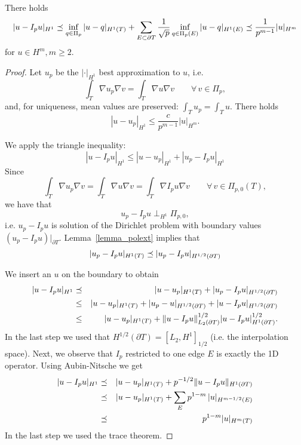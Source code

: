 \begin{theorem}  There holds 
$$
| u - I_p u |_{H^1} \preceq
\inf_{q \in \Pi_p} | u - q |_{H^1(T)} + 
\sum_{E \subset \partial T} \frac{1}{\sqrt{p}} \inf_{q \in \Pi_p(E)} | u - q |_{H^1(E)}
\preceq 
\frac{1}{p^{m-1}} | u |_{H^m} 
$$
for $u \in H^m, m \geq 2$.  
\end{theorem}
\begin{proof} Let $u_p$ be the $|\cdot |_{H^1}$ best approximation to $u$, i.e.
$$
\int_T \nabla u_p \nabla v = \int_T \nabla u \nabla v \qquad \forall \, v \in \Pi_p,
$$
and, for uniqueness, mean values are preserved: $\int_T u_p = \int_T u$. There holds
$$
| u - u_p |_{H^1} \leq  \frac{c}{p^{m-1}} | u |_{H^m}.
$$

We apply the triangle inequality:
$$
| u - I_p u |_{H^1} \leq | u - u_p |_{H^1} + | u_p - I_p u |_{H^1}
$$
Since 
$$
\int_T \nabla u_p \nabla v = \int_T \nabla u \nabla v = \int_T \nabla I_p u  \nabla v
\qquad \forall \, v \in \Pi_{p,0}(T),
$$
we have that
$$
u_p - I_p u \; \bot_{H^1} \; \Pi_{p,0},
$$
i.e. $u_p - I_p u$ is solution of the Dirichlet problem with boundary values
$ (u_p - I_p u)|_{\partial T}$. Lemma~\ref{lemma_polext} implies that
$$
| u_p - I_p u |_{H^1(T)} \preceq | u_p - I_p u |_{H^{1/2}(\partial T)}
$$

We insert an $u$ on the boundary to obtain
\begin{eqnarray*}
| u - I_p u |_{H^1} & \preceq & | u - u_p |_{H^1(T)} + | u_p - I_p u |_{H^{1/2}(\partial T)} \\
& \leq & | u - u_p |_{H^1(T)} + | u_p - u |_{H^{1/2}(\partial T)} + | u - I_p u |_{H^{1/2}(\partial T)} \\
& \leq & | u - u_p |_{H^1(T)} + 
\| u - I_p u \|_{L_2(\partial T)}^{1/2} 
| u - I_p u |_{H^1(\partial T)}^{1/2}.
\end{eqnarray*}
In the last step we used that $H^{1/2}(\partial T) = [L_2, H^1]_{1/2}$ (i.e. the interpolation space).
Next, we observe that $I_p$ restricted to one edge $E$ is exactly the 1D operator. Using Aubin-Nitsche we get
\begin{eqnarray*}
| u - I_p u |_{H^1} & \preceq & | u - u_p |_{H^1(T)} + p^{-1/2} \| u - I_p u\|_{H^1(\partial T)} \\
& \preceq & | u  - u_p |_{H^1(T)} + \sum_E p^{1-m} \, | u |_{H^{m-1/2}(E)} \\
& \preceq & p^{1-m} | u |_{H^m(T)}
\end{eqnarray*}
In the last step we used the trace theorem.
\end{proof}


%       